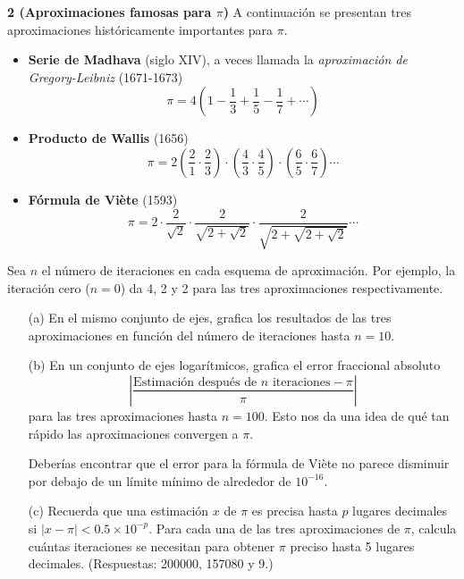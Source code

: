 \documentclass{article}
\begin{document}
\textbf{2 (Aproximaciones famosas para \(\pi\))} A continuación se presentan tres aproximaciones históricamente importantes para \(\pi\).

\begin{itemize}
    \item \textbf{Serie de Madhava} (siglo XIV), a veces llamada la \textit{aproximación de Gregory-Leibniz} (1671-1673)
    \[
    \pi = 4 \left( 1 - \frac{1}{3} + \frac{1}{5} - \frac{1}{7} + \cdots \right)
    \]
    
    \item \textbf{Producto de Wallis} (1656)
    \[
    \pi = 2 \left( \frac{2}{1} \cdot \frac{2}{3} \right) \cdot \left( \frac{4}{3} \cdot \frac{4}{5} \right) \cdot \left( \frac{6}{5} \cdot \frac{6}{7} \right) \cdots
    \]
    
    \item \textbf{Fórmula de Viète} (1593)
    \[
    \pi = 2 \cdot \frac{2}{\sqrt{2}} \cdot \frac{2}{\sqrt{2 + \sqrt{2}}} \cdot \frac{2}{\sqrt{2 + \sqrt{2 + \sqrt{2}}}} \cdots
    \]
\end{itemize}

Sea \(n\) el número de iteraciones en cada esquema de aproximación. Por ejemplo, la iteración cero (\(n = 0\)) da 4, 2 y 2 para las tres aproximaciones respectivamente.

\begin{itemize}
    \item[(a)] En el mismo conjunto de ejes, grafica los resultados de las tres aproximaciones en función del número de iteraciones hasta \(n = 10\).
    
    \item[(b)] En un conjunto de ejes logarítmicos, grafica el error fraccional absoluto
    \[
    \left| \frac{\text{Estimación después de } n \text{ iteraciones} - \pi}{\pi} \right|
    \]
    para las tres aproximaciones hasta \(n = 100\). Esto nos da una idea de qué tan rápido las aproximaciones convergen a \(\pi\).
    
    Deberías encontrar que el error para la fórmula de Viète no parece disminuir por debajo de un límite mínimo de alrededor de \(10^{-16}\). 
    
    \item[(c)] Recuerda que una estimación \(x\) de \(\pi\) es precisa hasta \(p\) lugares decimales si \(\left| x - \pi \right| < 0.5 \times 10^{-p}\). Para cada una de las tres aproximaciones de \(\pi\), calcula cuántas iteraciones se necesitan para obtener \(\pi\) preciso hasta 5 lugares decimales. (Respuestas: 200000, 157080 y 9.)
\end{itemize}
\end{document}
